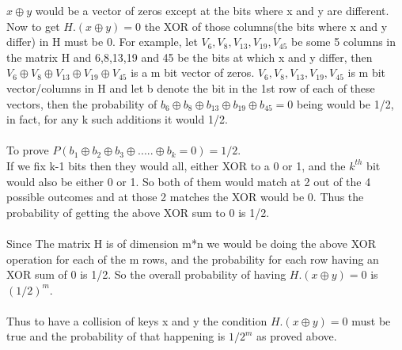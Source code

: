 \documentclass[12pt]{article}
\begin{document}
\(x\oplus y\) would be a vector of zeros except at the bits where x and y are different. Now to get \(H.(x\oplus y)=0\) the XOR of those columns(the bits where x and y differ) in H must be 0. For example, let \(V_6, V_8, V_{13}, V_{19}, V_{45}\) be some 5 columns in the matrix H and 6,8,13,19 and 45 be the bits at which x and y differ, then \(V_6 \oplus V_8 \oplus V_{13} \oplus V_{19} \oplus V_{45}\) is a m bit vector of zeros. \(V_6, V_8, V_{13}, V_{19}, V_{45}\) is m bit vector/columns in H and let b denote the bit in the 1st row of each of these vectors, then the probability of \(b_6 \oplus b_8 \oplus b_{13} \oplus b_{19} \oplus b_{45}=0\) being would be 1/2, in fact, for any k such additions it would 1/2. 
\\ \\
To prove \(P(b_1 \oplus b_2 \oplus b_3 \oplus ..... \oplus b_k=0)=1/2\). \\
If we fix k-1 bits then they would all, either XOR to a 0 or 1, and the \(k^{th}\) bit would also be either 0 or 1. So both of them would match at 2 out of the 4 possible outcomes and at those 2 matches the XOR would be 0. Thus the probability of getting the above XOR sum to 0 is 1/2. 
\\ \\
Since The matrix H is of dimension m*n we would be doing the above XOR operation for each of the m rows, and the probability for each row having an XOR sum of 0 is 1/2. So the overall probability of having \(H.(x\oplus y)=0\) is \((1/2)^m\). \\ \\
Thus to have a collision of keys x and y the condition \(H.(x\oplus y)=0\) must be true and the probability of that happening is \(1/2^m\) as proved above.
\end{document}
